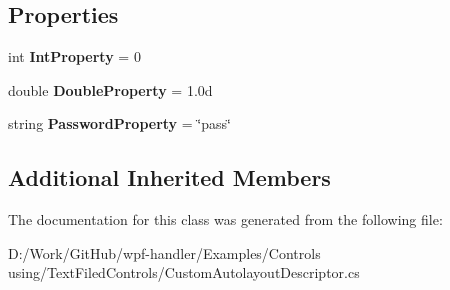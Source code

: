 \subsection*{Properties}
\begin{DoxyCompactItemize}
\item 
\mbox{\label{class_text_filed_controls_1_1_custom_autolayout_descriptor_ab0e1f92b36c551e8e9683eb4978640e1}} 
int {\bfseries Int\+Property} = 0
\item 
\mbox{\label{class_text_filed_controls_1_1_custom_autolayout_descriptor_a4ba164247d6f1c3d5ef123c6198d21c7}} 
double {\bfseries Double\+Property} = 1.\+0d
\item 
\mbox{\label{class_text_filed_controls_1_1_custom_autolayout_descriptor_adafd9c3b93a174005ea0ddc53fea0029}} 
string {\bfseries Password\+Property} = \char`\"{}pass\char`\"{}
\end{DoxyCompactItemize}
\subsection*{Additional Inherited Members}


The documentation for this class was generated from the following file\+:\begin{DoxyCompactItemize}
\item 
D\+:/\+Work/\+Git\+Hub/wpf-\/handler/\+Examples/\+Controls using/\+Text\+Filed\+Controls/Custom\+Autolayout\+Descriptor.\+cs\end{DoxyCompactItemize}
